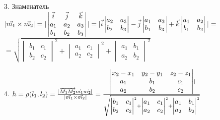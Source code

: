 3. Знаменатель $|\vec{m_1}\times\vec{m_2}| = |\begin{vmatrix}
    \vec{i}&\vec{j}&\vec{k}\\
    a_1 & a_2 & a_3\\
    b_1 & b_2 & b_3
\end{vmatrix}| = |\vec{i}
\begin{vmatrix}
    a_2 & a_3\\
    b_2 & b_3
\end{vmatrix} - \vec{j}
\begin{vmatrix}
    a_1 & a_3\\
    b_1 & b_3
\end{vmatrix} + \vec{k}
\begin{vmatrix}
    a_1 & a_2\\
    b_1 & b_2
\end{vmatrix}| = $ \\
$=\sqrt{\begin{vmatrix}b_1&c_1\\b_2&c_2\end{vmatrix}^2+
\begin{vmatrix}a_1&c_1\\a_2&c_2\end{vmatrix}^2+
\begin{vmatrix}a_1&b_1\\a_2&b_2\end{vmatrix}^2}$

4. $h = \rho(l_1, l_2) = \frac{ |\overrightarrow{M_1M_2}\vec{m_1}\vec{m_2}| }{ |\vec{m_1}\times\vec{m_2}| }=
\frac{ |\begin{vmatrix}x_2-x_1&y_2-y_1&z_2-z_1\\a_1&b_1&c_1\\a_2&b_2&c_2\end{vmatrix}| }
    {\sqrt{\begin{vmatrix}b_1&c_1\\b_2&c_2\end{vmatrix}^2+
    \begin{vmatrix}a_1&c_1\\a_2&c_2\end{vmatrix}^2+
    \begin{vmatrix}a_1&b_1\\a_2&b_2\end{vmatrix}^2}}$

